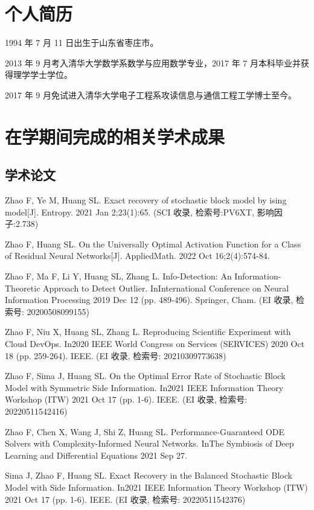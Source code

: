 
\begin{resume}

  \section*{个人简历}

  1994 年 7 月 11 日出生于山东省枣庄市。

  2013 年 9 月考入清华大学数学系数学与应用数学专业，2017 年 7 月本科毕业并获得理学学士学位。

  2017 年 9 月免试进入清华大学电子工程系攻读信息与通信工程工学博士至今。


  \section*{在学期间完成的相关学术成果}

  \subsection*{学术论文}

  \begin{achievements}
    \item Zhao F, Ye M, Huang SL. Exact recovery of stochastic block model by ising model[J]. Entropy. 2021 Jan 2;23(1):65. (SCI 收录, 检索号:PV6XT, 影响因子:2.738)
    \item Zhao F, Huang SL. On the Universally Optimal Activation Function for a Class of Residual Neural Networks[J]. AppliedMath. 2022 Oct 16;2(4):574-84.
    \item Zhao F, Ma F, Li Y, Huang SL, Zhang L. Info-Detection: An Information-Theoretic Approach to Detect Outlier. InInternational Conference on Neural Information Processing 2019 Dec 12 (pp. 489-496). Springer, Cham.
    (EI 收录, 检索号: 20200508099155)
    \item Zhao F, Niu X, Huang SL, Zhang L. Reproducing Scientific Experiment with Cloud DevOps. In2020 IEEE World Congress on Services (SERVICES) 2020 Oct 18 (pp. 259-264). IEEE.
    (EI 收录, 检索号: 20210309773638)
    \item Zhao F, Sima J, Huang SL. On the Optimal Error Rate of Stochastic Block Model with Symmetric Side Information. In2021 IEEE Information Theory Workshop (ITW) 2021 Oct 17 (pp. 1-6). IEEE.
    (EI 收录, 检索号: 20220511542416)
    \item Zhao F, Chen X, Wang J, Shi Z, Huang SL. Performance-Guaranteed ODE Solvers with Complexity-Informed Neural Networks. InThe Symbiosis of Deep Learning and Differential Equations 2021 Sep 27.
    \item Sima J, Zhao F, Huang SL. Exact Recovery in the Balanced Stochastic Block Model with Side Information. In2021 IEEE Information Theory Workshop (ITW) 2021 Oct 17 (pp. 1-6). IEEE.
    (EI 收录, 检索号: 20220511542376)
  \end{achievements}



\end{resume}
